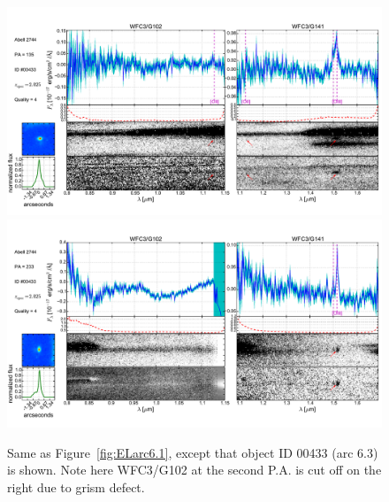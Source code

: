 \begin{figure}
    \centering
    \includegraphics[width=\textwidth]{fig/clA2744_id433_pa135_zsQ4.pdf}\\
    \includegraphics[width=\textwidth]{fig/clA2744_id433_pa233_zsQ4.pdf}
    \caption[Same as Figure~\ref{fig:ELarc6.1}, except that object ID 00433 (arc 6.3) is shown.]{Same as
    Figure~\ref{fig:ELarc6.1}, except that object ID 00433 (arc 6.3) is shown. Note here WFC3/G102 at the
    second P.A. is cut off on the right due to grism defect.}
    \label{fig:ELarc6.3}
\end{figure}

